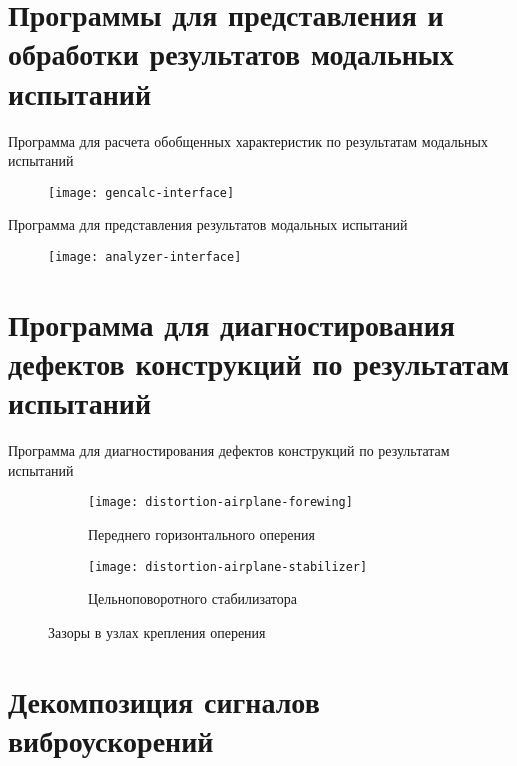 \section{Программы для представления и обработки результатов модальных испытаний}

\begin{frame}{Программа для расчета обобщенных характеристик по результатам модальных испытаний}
	\begin{figure}
		\centering
		\texttt{[image: gencalc-interface]}
	\end{figure}
\end{frame}

\begin{frame}{Программа для представления результатов модальных испытаний}
	\begin{figure}
		\centering
		\texttt{[image: analyzer-interface]}
	\end{figure}
\end{frame}

\section{Программа для диагностирования дефектов конструкций по результатам испытаний}

\begin{frame}{Программа для диагностирования дефектов конструкций по результатам испытаний}
	\begin{figure}
		\centering
		\begin{subfigure}[t]{0.49\textwidth}
			\texttt{[image: distortion-airplane-forewing]}
			\caption{Переднего горизонтального оперения}
		\end{subfigure}
		\hfill
		\begin{subfigure}[t]{0.49\textwidth}
			\texttt{[image: distortion-airplane-stabilizer]} 
			\caption{Цельноповоротного стабилизатора}
		\end{subfigure}
    	\caption{Зазоры в узлах крепления оперения} 
	\end{figure}
\end{frame}

\section{Декомпозиция сигналов виброускорений}

